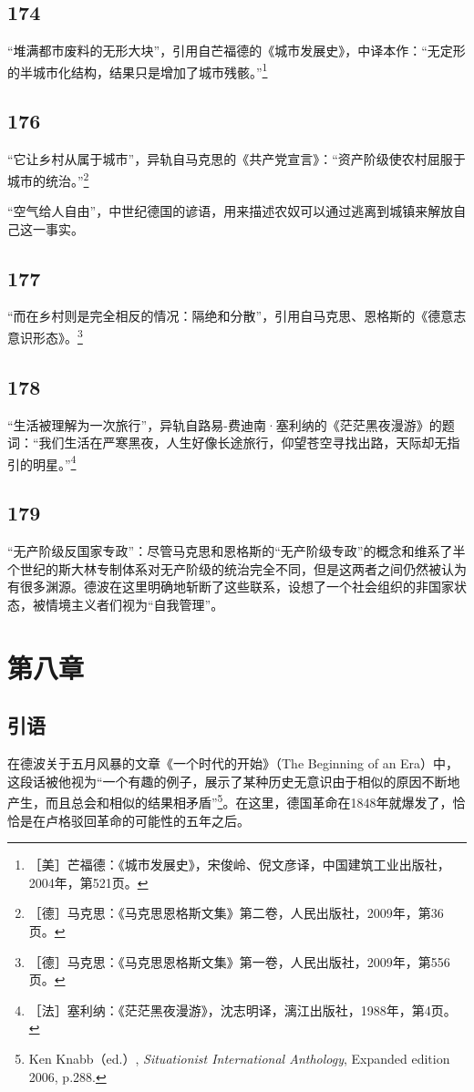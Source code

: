 \documentclass[fontset=fandol, a4paper, 12pt, openright]{ctexbook}
\begin{document}
\subsection*{174}
“堆满都市废料的无形大块”，引用自芒福德的《城市发展史》，中译本作：“无定形的半城市化结构，结果只是增加了城市残骸。”\footnote{［美］芒福德：《城市发展史》，宋俊岭、倪文彦译，中国建筑工业出版社，2004年，第521页。}

\subsection*{176}
“它让乡村从属于城市”，异轨自马克思的《共产党宣言》：“资产阶级使农村屈服于城市的统治。”\footnote{［德］马克思：《马克思恩格斯文集》第二卷，人民出版社，2009年，第36页。}

“空气给人自由”，中世纪德国的谚语，用来描述农奴可以通过逃离到城镇来解放自己这一事实。

\subsection*{177}
“而在乡村则是完全相反的情况：隔绝和分散”，引用自马克思、恩格斯的《德意志意识形态》。\footnote{［德］马克思：《马克思恩格斯文集》第一卷，人民出版社，2009年，第556页。}

\subsection*{178}
“生活被理解为一次旅行”，异轨自路易-费迪南·塞利纳的《茫茫黑夜漫游》的题词：“我们生活在严寒黑夜，人生好像长途旅行，仰望苍空寻找出路，天际却无指引的明星。”\footnote{［法］塞利纳：《茫茫黑夜漫游》，沈志明译，漓江出版社，1988年，第4页。}

\subsection*{179}
“无产阶级反国家专政”：尽管马克思和恩格斯的“无产阶级专政”的概念和维系了半个世纪的斯大林专制体系对无产阶级的统治完全不同，但是这两者之间仍然被认为有很多渊源。德波在这里明确地斩断了这些联系，设想了一个社会组织的非国家状态，被情境主义者们视为“自我管理”。

\section*{第八章}

\subsection*{引语}
在德波关于五月风暴的文章《一个时代的开始》（The Beginning of an Era）中，这段话被他视为“一个有趣的例子，展示了某种历史无意识由于相似的原因不断地产生，而且总会和相似的结果相矛盾”\footnote{Ken Knabb（ed.）, \textit{Situationist International Anthology}, Expanded edition 2006, p.288.}。在这里，德国革命在1848年就爆发了，恰恰是在卢格驳回革命的可能性的五年之后。
\end{document}

